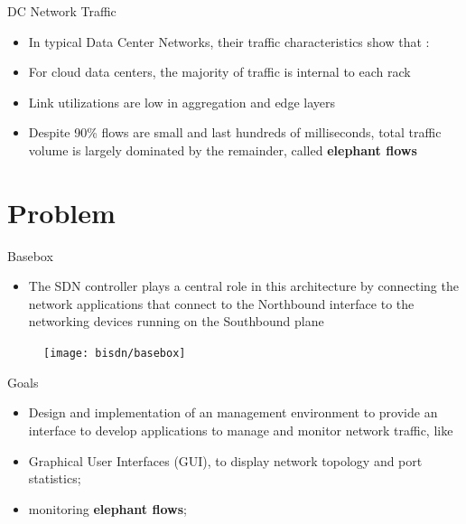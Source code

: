 \documentclass[aspectratio=43]{beamer}
\begin{document}
\begin{frame}{DC Network Traffic}
    \begin{itemize}
        \item In typical Data Center Networks, their traffic characteristics show that \cite{mori_identifying_2004}:

        \item For cloud data centers, the majority of traffic is internal to each rack

        \item Link utilizations are low in aggregation and edge layers

        \item Despite 90\% flows are small and last hundreds of milliseconds, total traffic volume is largely dominated by the remainder, called 
            \textbf{elephant flows} \cite{benson_network_2010}
    \end{itemize}
\end{frame}

\section{Problem}

\begin{frame}{Basebox}
    \begin{itemize}
        \item The SDN controller plays a central role in this architecture by connecting the network applications that connect to the Northbound interface to the
            networking devices running on the Southbound plane
    \end{itemize}

    \begin{figure}
        \texttt{[image: bisdn/basebox]}
    \end{figure}
\end{frame}

\begin{frame}{Goals}
    \begin{itemize}
        \item Design and implementation of an management environment to provide an interface to develop applications 
            to manage and monitor network traffic, like
            \pause 
        \item Graphical User Interfaces (GUI), to display network topology and port statistics;

        \item monitoring \textbf{elephant flows};
    \end{itemize}
\end{frame}
\end{document}

